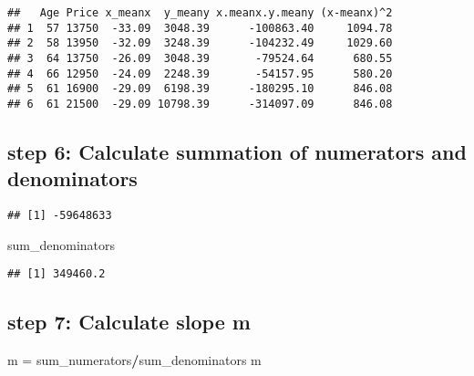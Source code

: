 \documentclass[]{article}
\newenvironment{Shaded}{\begin{snugshade}}{\end{snugshade}}
\newcommand{\DataTypeTok}[1]{\textcolor[rgb]{0.13,0.29,0.53}{#1}}
\newcommand{\KeywordTok}[1]{\textcolor[rgb]{0.13,0.29,0.53}{\textbf{#1}}}
\newcommand{\NormalTok}[1]{#1}
\newcommand{\OperatorTok}[1]{\textcolor[rgb]{0.81,0.36,0.00}{\textbf{#1}}}
\newcommand{\StringTok}[1]{\textcolor[rgb]{0.31,0.60,0.02}{#1}}
\begin{document}
\begin{verbatim}
##   Age Price x_meanx  y_meany x.meanx.y.meany (x-meanx)^2
## 1  57 13750  -33.09  3048.39      -100863.40     1094.78
## 2  58 13950  -32.09  3248.39      -104232.49     1029.60
## 3  64 13750  -26.09  3048.39       -79524.64      680.55
## 4  66 12950  -24.09  2248.39       -54157.95      580.20
## 5  61 16900  -29.09  6198.39      -180295.10      846.08
## 6  61 21500  -29.09 10798.39      -314097.09      846.08
\end{verbatim}

\hypertarget{step-6-calculate-summation-of-numerators-and-denominators}{%
\subsection{step 6: Calculate summation of numerators and
denominators}\label{step-6-calculate-summation-of-numerators-and-denominators}}

\begin{Shaded}
\end{Shaded}

\begin{verbatim}
## [1] -59648633
\end{verbatim}

\begin{Shaded}
\begin{Highlighting}[]
\NormalTok{sum_denominators}
\end{Highlighting}
\end{Shaded}

\begin{verbatim}
## [1] 349460.2
\end{verbatim}

\hypertarget{step-7-calculate-slope-m}{%
\subsection{step 7: Calculate slope m}\label{step-7-calculate-slope-m}}

\begin{Shaded}
\begin{Highlighting}[]
\NormalTok{m =}\StringTok{ }\NormalTok{sum_numerators}\OperatorTok{/}\NormalTok{sum_denominators}
\NormalTok{m}
\end{Highlighting}
\end{Shaded}
\end{document}
